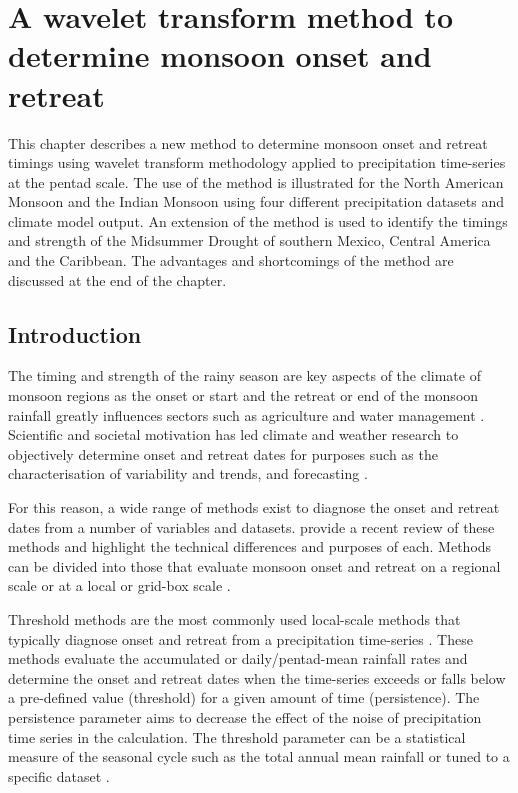 \chapter{\label{ch:5-wvt}A wavelet transform method to determine monsoon onset and retreat}

This chapter describes a new method to determine monsoon onset and retreat timings using wavelet transform methodology applied to precipitation time-series at the pentad scale. 
The use of the method is illustrated for the North American Monsoon and the Indian Monsoon using four different precipitation datasets and climate model output. 
An extension of the method is used to identify the timings and strength of the Midsummer Drought of southern Mexico, Central America and the Caribbean. 
The advantages and shortcomings of the method are discussed at the end of the chapter.

\section{Introduction}

The timing and strength of the rainy season are key aspects of the climate of monsoon regions as the onset or start and the retreat or end of the monsoon rainfall greatly influences sectors such as agriculture \citep{sultan2005,Gadgil2006,jain2015,harvey2018} and water management \citep{turner2012,bussman2016}.
Scientific and societal motivation has led climate and weather research to objectively determine  onset and retreat dates for purposes such as the characterisation of variability and trends, and forecasting \citep[e.g.][]{kitoh2006,cook2009,picher,nieto2011,htway2011}. 

For this reason, a wide range  of methods exist to diagnose the onset and retreat dates from a number of variables and datasets.
\cite{bombardi2019} provide a recent review of these methods and highlight the technical differences and purposes of each. Methods can be divided into those that evaluate monsoon onset and retreat on a regional scale \citep[e.g.][]{webster1992,fasullo2003,garcia2013}  or at a local or grid-box scale \citep[e.g.][]{liebmann2001interannual,cook2009}. 

Threshold methods are the most commonly used local-scale methods that typically diagnose onset and retreat from a precipitation time-series \citep{bombardi2019}. 
These methods evaluate the accumulated  \citep{liebmann2001interannual} or daily/pentad-mean rainfall rates \citep{geil2013} and determine the onset and retreat dates when the time-series exceeds or falls below a pre-defined value (threshold) for a given amount of time (persistence). The persistence parameter aims to decrease the effect of the noise of precipitation time series in the calculation. The threshold parameter can be a statistical measure of the seasonal cycle such as the total annual mean rainfall \citep{arias2012}  or tuned to a specific dataset \citep[e.g.][]{geil2013}.

